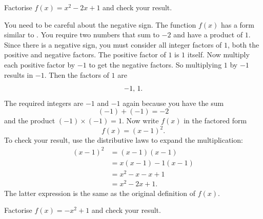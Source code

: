 \documentclass[a4paper,oneside,12pt]{article}
\begin{document}
\begin{example}
Factorise $f(x) = x^2 - 2x + 1$ and check your result.
\end{example}

\begin{solution}
You need to be careful about the negative sign.  The function $f(x)$
has a form similar to .  You
require two numbers that sum to $-2$ and have a product of $1$.  Since
there is a negative sign, you must consider all integer factors of
$1$, both the positive and negative factors.  The positive factor of
$1$ is $1$ itself.  Now multiply each positive factor by $-1$ to get
the negative factors.  So multiplying $1$ by $-1$ results in $-1$.
Then the factors of $1$ are
\[
{-1},\, {1}.
\]
The required integers are $-1$ and $-1$ again because you have the sum
\[
(-1) + (-1)
=
-2
\]
and the product $(-1) \times (-1) = 1$.  Now write $f(x)$ in the
factored form
\[
f(x)
=
(x - 1)^2.
\]
To check your result, use the distributive laws to expand the
multiplication:
\begin{align*}
(x - 1)^2
&=
(x - 1) (x - 1) \\[4pt]
&=
x(x - 1) - 1(x - 1) \\[4pt]
&=
x^2 - x - x + 1 \\[4pt]
&=
x^2 - 2x + 1.
\end{align*}
The latter expression is the same as the original definition of
$f(x)$.
\end{solution}

\begin{exercise}
Factorise $f(x) = -x^2 + 1$ and check your result.
\end{exercise}

\end{document}

